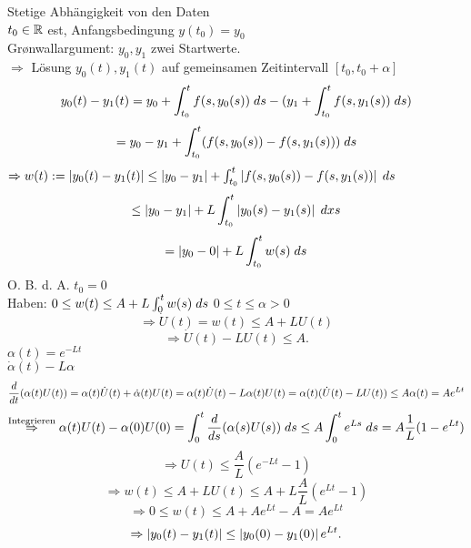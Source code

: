 \documentclass[../ana2.tex]{subfiles}
\begin{document}
Stetige Abhängigkeit von den Daten\\
\( t_0 \in \R \) est, Anfangsbedingung \( y(t_0) = y_0 \)\\
Gr\o{}nwallargument: \( y_0, y_1 \) zwei Startwerte.\\
\( \Rightarrow \) Lösung \( y_0(t), y_1(t) \) auf gemeinsamen Zeitintervall \( [t_0, t_0 + \alpha] \)
\[ y_0(t) - y_1(t) = y_0 + \integralx{ f(s, y_0(s)) }{t_0}{t}{s} - (y_1 + \integralx{f(s, y_1(s))}{t_0}{t}{s}) \]
\[ = y_0 - y_1 + \integralx{ (f(s, y_0(s)) - f(s, y_1(s))) }{t_0}{t}{s} \]
\( \Rightarrow w(t) := \abs{ y_0(t) - y_1(t) } 
\leq \abs{ y_0 - y_1 } 
+ \integralx{ \abs{ f(s, y_0(s)) - f(s, y_1(s)) } }{t_0}{t}{s} \)
\[ \leq \abs{ y_0 - y_1 } + L \integral{ \abs{ y_0(s) - y_1(s) } }{t_0}{t}{s} \]
\[= \abs{y_0 - 0} + L \integralx{w(s)}{t_0}{t}{s} \]
O. B. d. A. \( t_0 = 0 \)\\
Haben: \( 0 \leq w(t) \leq A + L \integralx{w(s)}{0}{t}{s} \)
\(0 \leq t \leq \alpha > 0\)
\[ \Rightarrow \dot{U}(t) = w(t) \leq A + L U(t) \]
\[ \Rightarrow \dot{U}(t) - LU(t) \leq A. \]
\( \alpha(t) = e^{-L t} \)\\
\( \dot{\alpha}(t) -L \alpha \)
\[ \ddx{t}(\alpha(t) U(t)) 
= \alpha(t) \dot{U}(t) + \dot{\alpha}(t) U(t) 
= \alpha(t) \dot{U}(t) - L \alpha(t) U(t)
= \alpha(t) (\dot{U}(t) - LU(t)) 
\leq A \alpha(t) = A e^{Lt} \]
\[ \oversett{Integrieren}{\Rightarrow} \alpha(t) U(t) - \alpha(0) U(0) 
= \integralx{ \ddx{s} (\alpha(s) U(s)) }{0}{t}{s} 
\leq A \integralx{ e^{Ls} }{0}{t}{s} 
= A \frac{1}{L} (1 - e^{Lt}) \]
\[ \Rightarrow U(t) \leq \frac{A}{L}(e^{-Lt} - 1) \]
\[ \Rightarrow w(t) \leq A + L U(t) \leq A + L \frac{A}{L} (e^{Lt} - 1) \]
\[ \Rightarrow 0 \leq w(t) \leq A + A e^{Lt} - A = Ae^{Lt} \]
\[ \Rightarrow \abs{ y_0(t) - y_1(t) } \leq \abs{ y_0(0) - y_1(0) }e^{Lt}. \]
\end{document}
